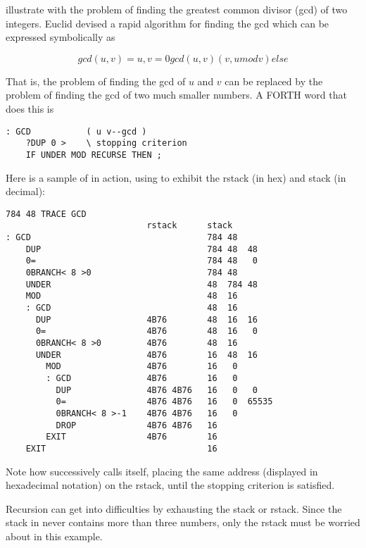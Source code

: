  illustrate with the problem of finding the greatest common divisor (gcd) of two integers. Euclid devised a rapid algorithm for finding the gcd which can be expressed symbolically as

\begin{equation}
    gcd(u,v) = u, v= 0
    gcd(u,v) (v, u mod v) else
\end{equation}
    
That is, the problem of finding the gcd of $u$ and $v$ can be replaced by the problem of finding the gcd of two much smaller numbers. A FORTH word that does this is

\begin{lstlisting}
: GCD           ( u v--gcd )
    ?DUP 0 >    \ stopping criterion
    IF UNDER MOD RECURSE THEN ;
\end{lstlisting}

Here is a sample of  in action, using  to exhibit the rstack (in hex) and stack (in decimal):

\begin{lstlisting}
784 48 TRACE GCD
                            rstack      stack
: GCD                                   784 48
    DUP                                 784 48  48
    0=                                  784 48   0
    0BRANCH< 8 >0                       784 48
    UNDER                               48  784 48
    MOD                                 48  16
    : GCD                               48  16
      DUP                   4B76        48  16  16
      0=                    4B76        48  16   0
      0BRANCH< 8 >0         4B76        48  16
      UNDER                 4B76        16  48  16
        MOD                 4B76        16   0
        : GCD               4B76        16   0
          DUP               4B76 4B76   16   0   0
          0=                4B76 4B76   16   0  65535
          0BRANCH< 8 >-1    4B76 4B76   16   0
          DROP              4B76 4B76   16
        EXIT                4B76        16
    EXIT                                16
\end{lstlisting}

Note how  successively calls itself, placing the same address (displayed in hexadecimal notation) on the rstack, until the stopping criterion is satisfied.

Recursion can get into difficulties by exhausting the stack or rstack. Since the stack in  never contains more than three numbers, only the rstack must be worried about in this example.

